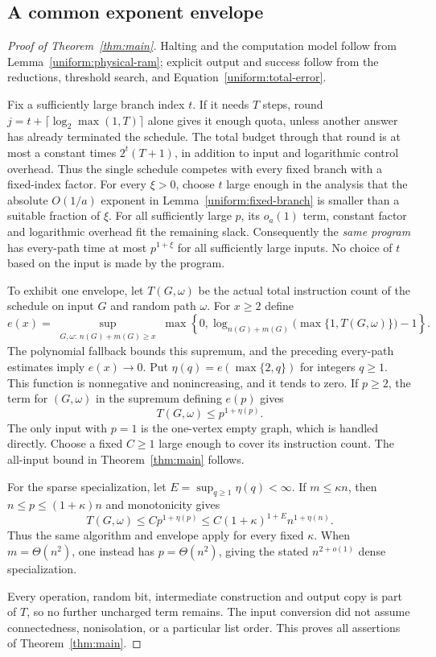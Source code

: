 \subsection{A common exponent envelope}

\begin{proof}[Proof of Theorem~\ref{thm:main}]
Halting and the computation model follow from
Lemma~\ref{uniform:physical-ram}; explicit output and success follow
from the reductions, threshold search, and
Equation~\eqref{uniform:total-error}.

Fix a sufficiently large branch index $t$. If it needs $T$ steps,
round $j=t+\lceil\log_2\max(1,T)\rceil$ alone gives it enough quota,
unless another answer has already terminated the schedule. The total
budget through that round is at most a constant times $2^t(T+1)$,
in addition to input and logarithmic control overhead. Thus the single
schedule competes with every fixed branch with a fixed-index factor.
For every $\xi>0$, choose $t$ large enough in the analysis that the
absolute $O(1/a)$ exponent in Lemma~\ref{uniform:fixed-branch} is smaller
than a suitable fraction of $\xi$. For all sufficiently large $p$, its
$o_a(1)$ term, constant factor and logarithmic overhead fit the remaining
slack. Consequently the \emph{same program} has every-path time at most
$p^{1+\xi}$ for all sufficiently large inputs. No choice of $t$ based on
the input is made by the program.

To exhibit one envelope, let $T(G,\omega)$ be the actual total instruction
count of the schedule on input $G$ and random path $\omega$. For $x\ge2$
define
\[
 e(x)=\sup_{\substack{G,\omega:\,n(G)+m(G)\ge x}}
 \max\left\{0,
 \log_{n(G)+m(G)}\bigl(\max\{1,T(G,\omega)\}\bigr)-1\right\}.
\]
The polynomial fallback bounds this supremum, and the preceding
every-path estimates imply $e(x)\to0$. Put
$\eta(q)=e(\max\{2,q\})$ for integers $q\ge1$. This function is
nonnegative and nonincreasing, and it tends to zero. If $p\ge2$, the term
for $(G,\omega)$ in the supremum defining $e(p)$ gives
\[
                    T(G,\omega)\le p^{1+\eta(p)}.
\]
The only input with $p=1$ is the one-vertex empty graph, which is handled
directly. Choose a fixed $C\ge1$ large enough to cover its instruction count.
The all-input bound in Theorem~\ref{thm:main} follows.

For the sparse specialization, let $E=\sup_{q\ge1}\eta(q)<\infty$.
If $m\le\kappa n$, then $n\le p\le(1+\kappa)n$ and monotonicity gives
\[
 T(G,\omega)\le C p^{1+\eta(p)}
 \le C(1+\kappa)^{1+E}n^{1+\eta(n)}.
\]
Thus the same algorithm and envelope apply for every fixed $\kappa$.
When $m=\Theta(n^2)$, one instead has $p=\Theta(n^2)$, giving the stated
$n^{2+o(1)}$ dense specialization.

Every operation, random bit, intermediate construction and output
copy is part of $T$, so no further uncharged term remains. The input
conversion did not assume connectedness, nonisolation, or a particular
list order. This proves all assertions of Theorem~\ref{thm:main}.
\end{proof}

